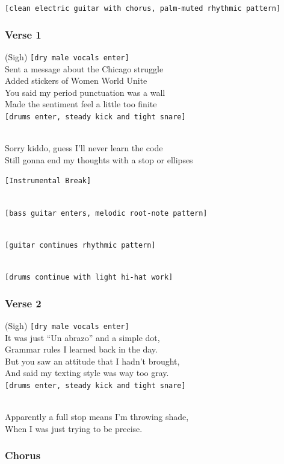 \texttt{{[}clean\ electric\ guitar\ with\ chorus,\ palm-muted\ rhythmic\ pattern{]}}

\subsubsection{Verse 1}\label{verse-1-8}

(Sigh) \texttt{{[}dry\ male\ vocals\ enter{]}}\\
Sent a message about the Chicago struggle\\
Added stickers of Women World Unite\\
You said my period punctuation was a wall\\
Made the sentiment feel a little too finite\\
\texttt{{[}drums\ enter,\ steady\ kick\ and\ tight\ snare{]}}\strut \\
Sorry kiddo, guess I'll never learn the code\\
Still gonna end my thoughts with a stop or ellipses

\texttt{{[}Instrumental\ Break{]}}\strut \\
\texttt{{[}bass\ guitar\ enters,\ melodic\ root-note\ pattern{]}}\strut \\
\texttt{{[}guitar\ continues\ rhythmic\ pattern{]}}\strut \\
\texttt{{[}drums\ continue\ with\ light\ hi-hat\ work{]}}

\subsubsection{Verse 2}\label{verse-2-8}

(Sigh) \texttt{{[}dry\ male\ vocals\ enter{]}}\\
It was just ``Un abrazo'' and a simple dot,\\
Grammar rules I learned back in the day.\\
But you saw an attitude that I hadn't brought,\\
And said my texting style was way too gray.\\
\texttt{{[}drums\ enter,\ steady\ kick\ and\ tight\ snare{]}}\strut \\
Apparently a full stop means I'm throwing shade,\\
When I was just trying to be precise.

\subsubsection{Chorus}\label{chorus-24}

